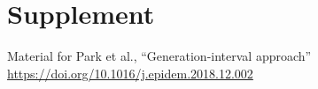 \documentclass[12pt]{article}
\begin{document}
\setcounter{figure}{0}
\setcounter{page}{1}
\setcounter{section}{0}

\renewcommand{\thefigure}{S\arabic{figure}}
\renewcommand{\thesection}{S\arabic{section}}

\section{Supplement}

Material for Park et al., ``Generation-interval approach'' \url{https://doi.org/10.1016/j.epidem.2018.12.002}



\clearpage

\printbibliography
\end{document}
